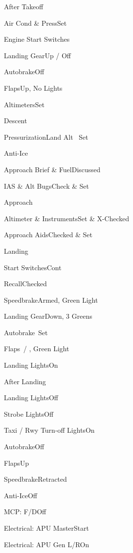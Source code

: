 \documentclass[sim-use]{checklist}
\begin{document}
\begin{checklist}{After Takeoff}
  \item{Air Cond \& Press}{Set}
  \item{Engine Start Switches}{\blank}
  \item{Landing Gear}{Up / Off}
  \item{Autobrake}{Off}
  \item{Flaps}{Up, No Lights}
  \item{Altimeters}{Set}
\end{checklist}

\begin{checklist}{Descent}
  \item{Pressurization}{Land Alt \blank\ Set}
  \item{Anti-Ice}{\blank}
  \item{Approach Brief \& Fuel}{Discussed}
  \item{IAS \& Alt Bugs}{Check \& Set}
\end{checklist}

\begin{checklist}{Approach}
  \item{Altimeter \& Instruments}{Set \& X-Checked}
  \item{Approach Aids}{Checked \& Set}
\end{checklist}

\begin{checklist}{Landing}
  \item{Start Switches}{Cont}
  \item{Recall}{Checked}
  \item{Speedbrake}{Armed, Green Light}
  \item{Landing Gear}{Down, 3 Greens}
  \item{Autobrake}{\blank\ Set}
  \item{Flaps}{\blank\ / \blank, Green Light}
  \item{Landing Lights}{On}
\end{checklist}

\begin{checklist}{After Landing}
  \item{Landing Lights}{Off}
  \item{Strobe Lights}{Off}
  \item{Taxi / Rwy Turn-off Lights}{On}
  \item{Autobrake}{Off}
  \item{Flaps}{Up}
  \item{Speedbrake}{Retracted}
  \item{Anti-Ice}{Off}
  \item{MCP: F/D}{Off}
  \item{Electrical: APU Master}{Start}
  \item{Electrical: APU Gen L/R}{On}
\end{checklist}
\end{document}
